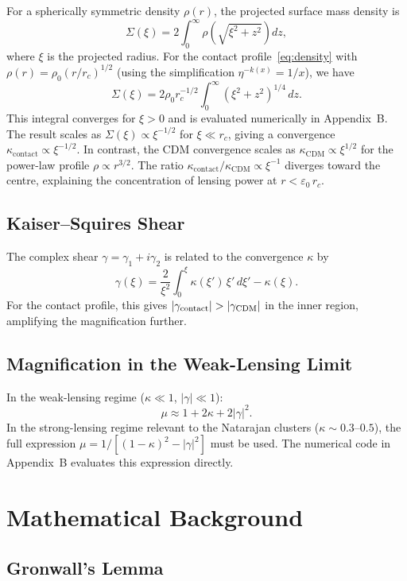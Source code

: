 \documentclass[11pt,a4paper,openright]{book}
\theoremstyle{dm3thm}
\theoremstyle{dm3def}
\newcommand{\eps}{\varepsilon_0}
\newcommand{\kc}{\kappa_{\mathrm{contact}}}
\newcommand{\kcdm}{\kappa_{\mathrm{CDM}}}
\newcommand{\rhoc}{\rho_0}
\newcommand{\rc}{r_c}
\newcommand{\etaT}{\eta}   %
\begin{document}
For a spherically symmetric density $\rho(r)$, the projected surface mass
density is
\[
  \Sigma(\xi) = 2\int_0^\infty \rho\!\left(\sqrt{\xi^2 + z^2}\right) dz,
\]
where $\xi$ is the projected radius.  For the contact profile~\eqref{eq:density}
with $\rho(r) = \rhoc (r/\rc)^{1/2}$ (using the simplification
$\etaT^{-k(x)} = 1/x$), we have
\[
  \Sigma(\xi)
  = 2\rhoc\rc^{-1/2}\int_0^\infty
    (\xi^2+z^2)^{1/4}\,dz.
\]
This integral converges for $\xi > 0$ and is evaluated numerically in
Appendix~B.  The result scales as $\Sigma(\xi) \propto \xi^{-1/2}$ for
$\xi \ll \rc$, giving a convergence $\kc \propto \xi^{-1/2}$.  In contrast,
the CDM convergence scales as $\kcdm \propto \xi^{1/2}$ for the power-law
profile $\rho \propto r^{3/2}$.  The ratio $\kc/\kcdm \propto \xi^{-1}$
diverges toward the centre, explaining the concentration of lensing power
at $r < \eps\,\rc$.

\section{Kaiser--Squires Shear}

The complex shear $\gamma = \gamma_1 + i\gamma_2$ is related to the
convergence $\kappa$ by
\[
  \gamma(\xi) = \frac{2}{\xi^2}\int_0^\xi \kappa(\xi')\,\xi'\,d\xi' - \kappa(\xi).
\]
For the contact profile, this gives $|\gamma_{\rm contact}| > |\gamma_{\rm CDM}|$
in the inner region, amplifying the magnification further.

\section{Magnification in the Weak-Lensing Limit}

In the weak-lensing regime ($\kappa \ll 1$, $|\gamma| \ll 1$):
\[
  \mu \approx 1 + 2\kappa + 2|\gamma|^2.
\]
In the strong-lensing regime relevant to the Natarajan clusters
($\kappa \sim 0.3$--$0.5$), the full expression
$\mu = 1/[(1-\kappa)^2 - |\gamma|^2]$ must be used.  The numerical code
in Appendix~B evaluates this expression directly.

\chapter{Mathematical Background}
\label{app:math}

\section{Gronwall's Lemma}
\end{document}
